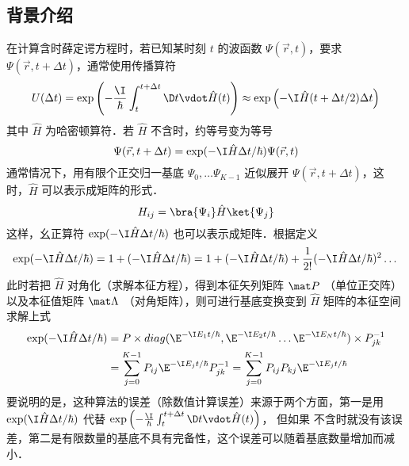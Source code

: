 
\subsection{背景介绍}

在计算含时薛定谔方程时，若已知某时刻 $t$ 的波函数 $\Psi(\vec r,t)$，要求 $\Psi(\vec r,t+\Delta t)$，通常使用传播算符 %
 \begin{equation}
U(\Delta t) = \exp\left( -\frac{\I}{\hbar} \int_{t}^{t+\Delta t} \D t\vdot \hat H(t) \right)
\approx \exp\left(-\I\hat H(t+\Delta t/2) \Delta t \right)
\end{equation}
其中 $\hat H$ 为哈密顿算符．若 $\hat H$ 不含时，约等号变为等号
\begin{equation}
\Psi(\vec r, t+\Delta t) = \exp(-\I\hat H\Delta t/\hbar)\Psi(\vec r, t)
\end{equation}
通常情况下，用有限个正交归一基底 $\Psi_0,\dots\Psi_{K-1}$ 近似展开 $\Psi(\vec r,t+\Delta t)$，这时，$\hat H$ 可以表示成矩阵的形式．
\begin{equation}
H_{ij} = \bra{\Psi_i} \hat H \ket{\Psi_j}
\end{equation}
这样，幺正算符 $\exp(-\I\hat H\Delta t/\hbar)$ 也可以表示成矩阵．根据定义 %
\begin{equation}
\exp(-\I\hat H\Delta t/\hbar) = 1+(-\I\hat H\Delta t/\hbar) = 1+(-\I\hat H\Delta t/\hbar) + \frac{1}{2!}(-\I\hat H\Delta t/\hbar)^2\dots
\end{equation}
此时若把 $\hat H$ 对角化（求解本征方程），得到本征矢列矩阵 $\mat P$ （单位正交阵）以及本征值矩阵 $\mat \Lambda$ （对角矩阵），则可进行基底变换变到 $\hat H$ 矩阵的本征空间求解上式 %
\begin{equation}\begin{aligned}
\exp(-\I\hat H\Delta t/\hbar) &= P\times diag(\E^{-\I E_1 t/\hbar},\E^{-\I E_2 t/\hbar}\dots \E^{-\I E_N t/\hbar})\times P_{jk}^{-1}\\
&= \sum_{j=0}^{K-1} P_{ij} \E^{-\I E_j t/\hbar} P_{jk}^{-1}
= \sum_{j=0}^{K-1} P_{ij}P_{kj} \E^{-\I E_j t/\hbar} 
\end{aligned}\end{equation}
要说明的是，这种算法的误差（除数值计算误差）来源于两个方面，第一是用 $\exp(\I\hat H\Delta t/\hbar)$ 代替 $\exp\left( -\frac{\I}{\hbar} \int_{t}^{t+\Delta t} \D t\vdot \hat H(t) \right)$， 但如果 不含时就没有该误差，第二是有限数量的基底不具有完备性，这个误差可以随着基底数量增加而减小．

